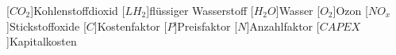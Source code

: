 \label{sec:Symbole}
\begin{acronym}[6LoWPAN]

    [$CO_2$]{Kohlenstoffdioxid}
	[$LH_2$]{flüssiger Wasserstoff}
	[$H_2O$]{Wasser}
	[$O_2$]{Ozon}
	[$NO_x$]{Stickstoffoxide}
	[$C$]{Kostenfaktor}
	[$P$]{Preisfaktor}
	[$N$]{Anzahlfaktor}
	[$CAPEX$]{Kapitalkosten}
	
\end{acronym}